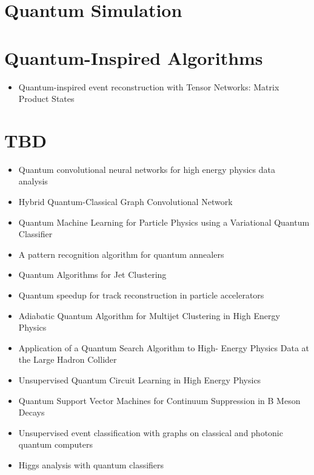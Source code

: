 \section{Quantum Simulation}



\section{Quantum-Inspired Algorithms}

\begin{itemize}
   \item Quantum-inspired event reconstruction with Tensor Networks: Matrix Product States~\cite{Araz:2021zwu}
\end{itemize}


\section{TBD}

\begin{itemize}
   \item Quantum convolutional neural networks for high energy physics data analysis~\cite{Chen:2020zkj}
   \item Hybrid Quantum-Classical Graph Convolutional Network~\cite{Chen:2021ouz}
   \item Quantum Machine Learning for Particle Physics using a Variational Quantum Classifier~\cite{Blance:2020nhl}
   \item A pattern recognition algorithm for quantum annealers~\cite{Bapst:2019llh}
   \item Quantum Algorithms for Jet Clustering~\cite{Wei:2019rqy}
   \item Quantum speedup for track reconstruction in particle accelerators~\cite{Magano:2021jzd}
   \item Adiabatic Quantum Algorithm for Multijet Clustering in High Energy Physics~\cite{Pires:2020urc}
   \item Application of a Quantum Search Algorithm to High- Energy Physics Data at the Large Hadron Collider~\cite{Armenakas:2020ymp}
   \item Unsupervised Quantum Circuit Learning in High Energy Physics~\cite{Delgado:2022aty}
   \item Quantum Support Vector Machines for Continuum Suppression in B Meson Decays~\cite{Heredge:2021vww}
   \item Unsupervised event classification with graphs on classical and photonic quantum computers~\cite{Blance:2020ktp}
   \item Higgs analysis with quantum classifiers~\cite{Belis:2021zqi}
\end{itemize}


